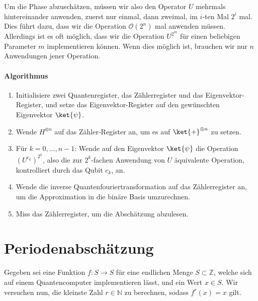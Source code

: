 Um die Phase abzuschätzen, müssen wir also den Operator $U$ mehrmals hintereinander anwenden, zuerst nur einmal, dann zweimal, im $i$-ten Mal $2^i$ mal. Dies führt dazu, dass wir die Operation $\mathcal O(2^n)$ mal anwenden müssen. Allerdings ist es oft möglich, dass wir die Operation $U^{2^m}$ für einen beliebigen Parameter $m$ implementieren können. Wenn dies möglich ist, brauchen wir nur $n$ Anwendungen jener Operation.

\paragraph{Algorithmus}
\begin{enumerate}
    \item Initialisiere zwei Quantenregister, das Zählerregister und das Eigenvektor-Register, und setze das Eigenvektor-Register auf den gewünschten Eigenvektor $\ket{\psi}$.
    \item Wende $H^{\otimes n}$ auf das Zähler-Register an, um es auf $\ket{+}^{\otimes n}$ zu setzen.
    \item Für $k = 0, \dots, n - 1$: Wende auf den Eigenvektor $\ket{\psi}$ die Operation $(U^{c_k})^{2^k}$, also die zur $2^k$-fachen Anwendung von $U$ äquivalente Operation, kontrolliert durch das Qubit $c_k$, an.
    \item Wende die inverse Quantenfouriertransformation auf das Zählerregister an, um die Approximation in die binäre Basis umzurechnen.
    \item Miss das Zählerregister, um die Abschätzung abzulesen.
\end{enumerate}
\paragraph{}

\paragraph{}

\section{Periodenabschätzung}
Gegeben sei eine Funktion $f : S \rightarrow S$ für eine endlichen Menge $S \subset \mathbb{Z}$, welche sich auf einem Quantencomputer implementieren lässt, und ein Wert $x \in S$. Wir versuchen nun, die kleinste Zahl $r \in \mathbb{N}$ zu berechnen, sodass $f^r(x) = x$ gilt.
